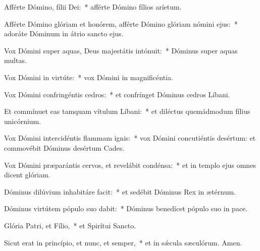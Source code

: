 \item Afférte Dómino, fílii Dei:~* afférte Dómino fílios aríetum.

\item Afférte Dómino glóriam et honórem, afférte Dómino glóriam nómini ejus:~* adoráte Dóminum in átrio sancto ejus.

\item Vox Dómini super aquas, Deus majestátis intónuit:~* Dóminus super aquas multas.

\item Vox Dómini in virtúte:~* vox Dómini in magnificéntia.

\item Vox Dómini confringéntis cedros:~* et confrínget Dóminus cedros Líbani.

\item Et commínuet eas tamquam vítulum Líbani:~* et diléctus quemádmodum fílius unicórnium.

\item Vox Dómini intercidéntis flammam ignis:~* vox Dómini concutiéntis desértum: et commovébit Dóminus desértum Cades.

\item Vox Dómini præparántis cervos, et revelábit condénsa:~* et in templo ejus omnes dicent glóriam.

\item Dóminus dilúvium inhabitáre facit:~* et sedébit Dóminus Rex in ætérnum.

\item Dóminus virtútem pópulo suo dabit:~* Dóminus benedícet pópulo suo in pace.

\item Glória Patri, et Fílio,~* et Spirítui Sancto.

\item Sicut erat in princípio, et nunc, et semper,~* et in sǽcula sæculórum. Amen.

